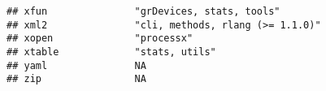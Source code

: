 \documentclass[
]{article}
\begin{document}
\begin{verbatim}
## xfun               "grDevices, stats, tools"                                                                                                                                                                                                                                                                                                                                                                                                                    
## xml2               "cli, methods, rlang (>= 1.1.0)"                                                                                                                                                                                                                                                                                                                                                                                                             
## xopen              "processx"                                                                                                                                                                                                                                                                                                                                                                                                                                   
## xtable             "stats, utils"                                                                                                                                                                                                                                                                                                                                                                                                                               
## yaml               NA                                                                                                                                                                                                                                                                                                                                                                                                                                           
## zip                NA                                                                                                                                                                                                                                                                                                                                                                                                                                           

\end{verbatim}
\end{document}
